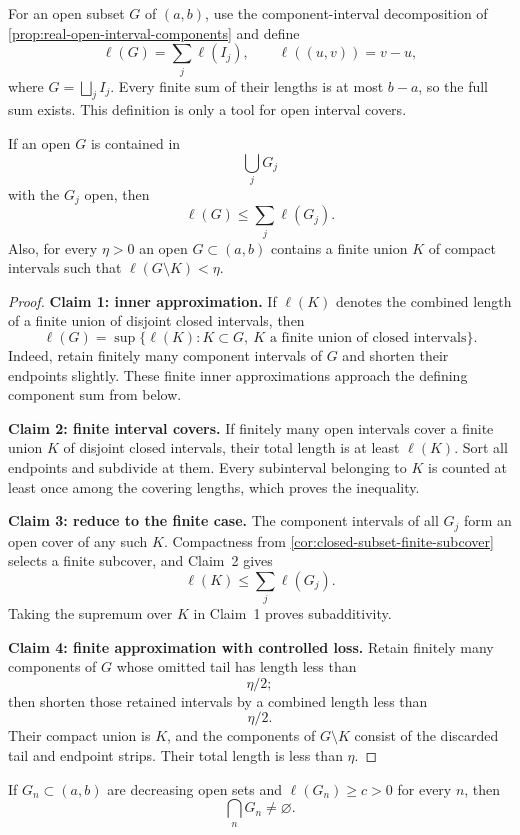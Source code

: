 For an open subset $G$ of $(a,b)$, use the component-interval decomposition
of \cref{prop:real-open-interval-components} and define
\[
\ell(G)=\sum_j\ell(I_j),\qquad \ell((u,v))=v-u,
\]
where $G=\bigsqcup_j I_j$.
Every finite sum of their lengths is at most $b-a$, so the full sum
exists. This definition is only a tool for open interval covers.
\begin{lemma}
\label{lem:open-length-tool}
If an open $G$ is contained in
\[
\bigcup_jG_j
\]
 with the $G_j$ open,
then
\[
\ell(G)\leq\sum_j\ell(G_j).
\]
 Also, for every $\eta>0$ an
open $G\subset(a,b)$ contains a finite union $K$ of compact intervals
such that $\ell(G\setminus K)<\eta$.
\end{lemma}
\begin{proof}
\textbf{Claim 1: inner approximation.} If $\ell(K)$ denotes the combined
length of a finite union of disjoint closed intervals, then
\[
\ell(G)=\sup\{\ell(K):K\subset G,\ K\text{ a finite union of closed intervals}\}.
\]
Indeed, retain finitely many component intervals of $G$ and shorten their
endpoints slightly. These finite inner approximations approach the defining
component sum from below.

\textbf{Claim 2: finite interval covers.} If finitely many open intervals
cover a finite union $K$ of disjoint closed intervals, their total length
is at least $\ell(K)$. Sort all endpoints and subdivide at them. Every
subinterval belonging to $K$ is counted at least once among the covering
lengths, which proves the inequality.

\textbf{Claim 3: reduce to the finite case.} The component intervals of
all $G_j$ form an open cover of any such $K$. Compactness from
\cref{cor:closed-subset-finite-subcover} selects a finite subcover, and
Claim~2 gives
\[
\ell(K)\leq\sum_j\ell(G_j).
\]
Taking the supremum over $K$ in Claim~1 proves subadditivity.

\textbf{Claim 4: finite approximation with controlled loss.} Retain
finitely many components of $G$ whose omitted tail has length less than
\[
\eta/2;
\]
then shorten those retained intervals by a combined length less than
\[
\eta/2.
\]
Their compact union is $K$, and the components of $G\setminus K$ consist of the
discarded tail and endpoint strips. Their total length is less than $\eta$.
\end{proof}
\begin{lemma}
\label{lem:nested-open-length}
If $G_n\subset(a,b)$ are decreasing open sets and
$\ell(G_n)\geq c>0$ for every $n$, then
\[
\bigcap_nG_n\ne\varnothing.
\]

\end{lemma}
